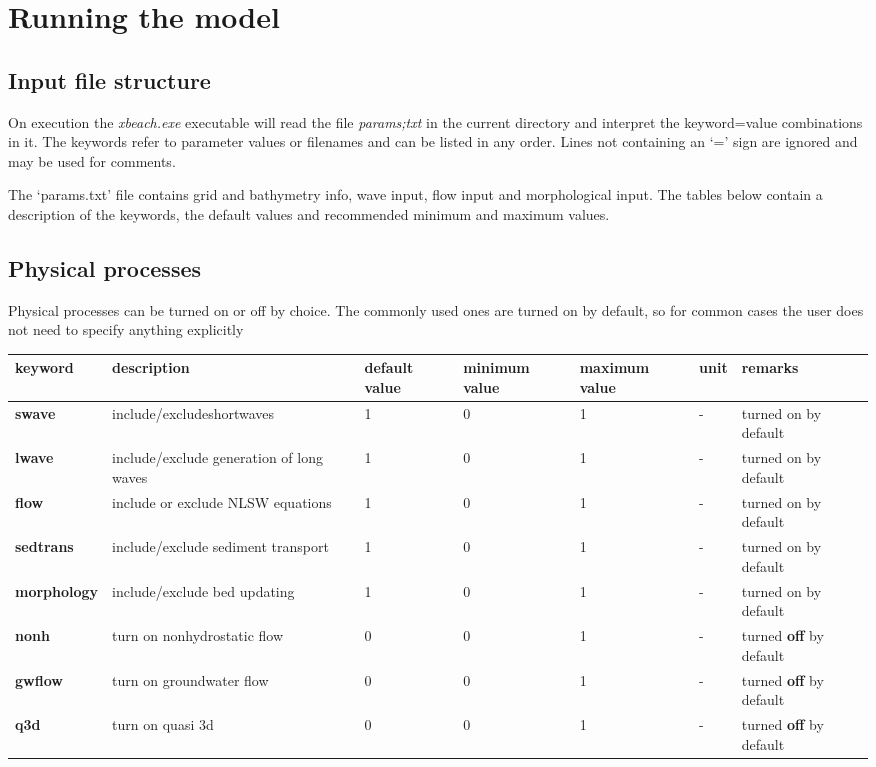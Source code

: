 \chapter{Running the model}
\section{Input file structure}

On execution the \textit{xbeach.exe} executable will read the file \textit{params;txt} in the current directory and interpret the keyword=value combinations in it. The keywords refer to parameter values or filenames and can be listed in any order. Lines not containing an `=' sign are ignored and may be used for comments.

The `params.txt' file contains grid and bathymetry info, wave input, flow input and morphological input. The tables below contain a description of the keywords, the default values and recommended minimum and maximum values.


\section{Physical processes}

Physical processes can be turned on or off by choice. The commonly used ones are turned on by default, so for common cases the user does not need to specify anything explicitly

\begin{tabular}{|p{0.6in}|p{0.8in}|p{0.4in}|p{0.5in}|p{0.5in}|p{0.3in}|p{0.6in}|} \hline 
keyword & description & default value & minimum value & maximum value & unit & remarks \\ \hline 
\textbf{swave} & include/exclude\newline shortwaves & 1 & 0 & 1 & - & turned on by default \\ \hline 
\textbf{lwave} & include/exclude generation of long waves & 1 & 0 & 1 & - & turned on by default \\ \hline 
\textbf{flow} & include or exclude NLSW equations & 1 & 0 & 1 & - & turned on by default \\ \hline 
\textbf{sedtrans} & include/exclude sediment transport & 1 & 0 & 1 & - & turned on by default \\ \hline 
\textbf{morphology} & include/exclude bed updating & 1 & 0 & 1 & - & turned on by default \\ \hline 
\textbf{nonh} & turn on nonhydrostatic flow & 0 & 0 & 1 & - & turned \textbf{off }by default \\ \hline 
\textbf{gwflow} & turn on groundwater flow & 0 & 0 & 1 & - & turned \textbf{off }by default \\ \hline 
\textbf{q3d} & turn on quasi 3d & 0 & 0 & 1 & - & turned \textbf{off }by default \\ \hline 
\end{tabular}


